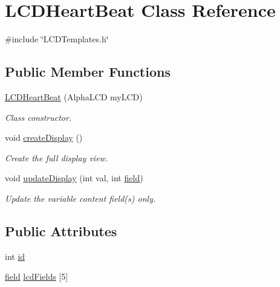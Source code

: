 \hypertarget{class_l_c_d_heart_beat}{\section{L\-C\-D\-Heart\-Beat Class Reference}
\label{class_l_c_d_heart_beat}
}


{\ttfamily \#include \char`\"{}L\-C\-D\-Templates.\-h\char`\"{}}

\subsection*{Public Member Functions}
\begin{DoxyCompactItemize}
\item 
\hyperlink{class_l_c_d_heart_beat_a54c857d31afa642d946fc1097858acbf}{L\-C\-D\-Heart\-Beat} (Alpha\-L\-C\-D my\-L\-C\-D)
\begin{DoxyCompactList}\small\item\em Class constructor. \end{DoxyCompactList}\item 
void \hyperlink{class_l_c_d_heart_beat_a50ff49a0e583a49ed97781dad0443ee2}{create\-Display} ()
\begin{DoxyCompactList}\small\item\em Create the full display view. \end{DoxyCompactList}\item 
void \hyperlink{class_l_c_d_heart_beat_a8df54752e6e699e9fc1a73b43c011dbd}{update\-Display} (int val, int \hyperlink{_l_c_d_templates_8h_a20a49e010fbfc3a43959f12d92e01bb6}{field})
\begin{DoxyCompactList}\small\item\em Update the variable content field(s) only. \end{DoxyCompactList}\end{DoxyCompactItemize}
\subsection*{Public Attributes}
\begin{DoxyCompactItemize}
\item 
int \hyperlink{class_l_c_d_heart_beat_ab8a6761e9071361d1c9015586707338d}{id}
\item 
\hyperlink{_l_c_d_templates_8h_a20a49e010fbfc3a43959f12d92e01bb6}{field} \hyperlink{class_l_c_d_heart_beat_a1263743be2d71a8219f8e15eef9f0b33}{lcd\-Fields} \mbox{[}5\mbox{]}
\end{DoxyCompactItemize}

